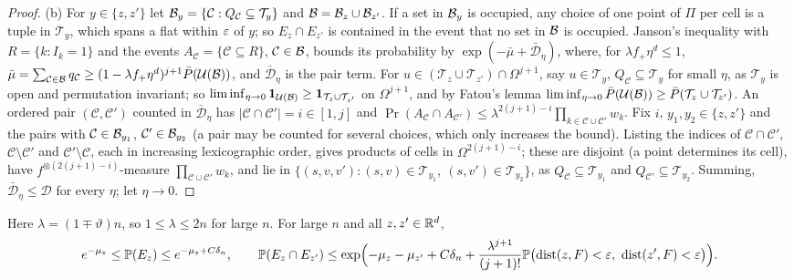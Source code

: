 \documentclass[11pt]{article}
\begin{document}
\begin{proof}
(b) For $y\in\{z,z'\}$ let $\mathcal{B}_y=\{\mathcal C:Q_{\mathcal C}\subseteq\mathcal T_y\}$ and $\mathcal{B}=\mathcal{B}_z\cup\mathcal{B}_{z'}$. If a set in $\mathcal{B}_y$ is occupied, any choice of one
point of $\Pi$ per cell is a tuple in $\mathcal T_y$, which spans a flat within $\varepsilon$ of $y$; so $E_z\cap E_{z'}$ is contained in the event
that no set in $\mathcal{B}$ is occupied. Janson's inequality with $R=\{k:I_k=1\}$ and the events $A_{\mathcal C}=\{\mathcal C\subseteq R\}$, $\mathcal C\in\mathcal{B}$, bounds
its probability by $\exp(-\bar\mu+\bar{\mathcal D}_\eta)$, where, for $\lambda f_+\eta^d\le1$, $\bar\mu=\sum_{\mathcal C\in\mathcal{B}}q_{\mathcal C}\ge(1-\lambda f_+\eta^d)^{j+1}\bar P(\mathcal U(\mathcal{B}))$,
and $\bar{\mathcal D}_\eta$ is the pair term. For $u\in(\mathcal T_z\cup\mathcal T_{z'})\cap\Omega^{j+1}$, say $u\in\mathcal T_y$, $Q_{\mathcal C}\subseteq\mathcal T_y$ for small $\eta$, as $\mathcal T_y$ is
open and permutation invariant; so $\liminf_{\eta\to0}\mathbf{1}_{\mathcal U(\mathcal{B})}\ge\mathbf{1}_{\mathcal T_z\cup\mathcal T_{z'}}$ on $\Omega^{j+1}$, and by Fatou's lemma
$\liminf_{\eta\to0}\bar P(\mathcal U(\mathcal{B}))\ge\bar P(\mathcal T_z\cup\mathcal T_{z'})$. An ordered pair $(\mathcal C,\mathcal C')$ counted in $\bar{\mathcal D}_\eta$ has
$|\mathcal C\cap\mathcal C'|=i\in[1,j]$ and $\Pr(A_{\mathcal C}\cap A_{\mathcal C'})\le\lambda^{2(j+1)-i}\prod_{k\in\mathcal C\cup\mathcal C'}w_k$. Fix $i$, $y_1,y_2\in\{z,z'\}$ and the
pairs with $\mathcal C\in\mathcal{B}_{y_1}$, $\mathcal C'\in\mathcal{B}_{y_2}$ (a pair may be counted for several choices, which only increases the bound). Listing the
indices of $\mathcal C\cap\mathcal C'$, $\mathcal C\setminus\mathcal C'$ and $\mathcal C'\setminus\mathcal C$, each in increasing lexicographic order, gives products of
cells in $\Omega^{2(j+1)-i}$; these are disjoint (a point determines its cell), have $f^{\otimes(2(j+1)-i)}$-measure $\prod_{\mathcal C\cup\mathcal C'}w_k$,
and lie in $\{(s,v,v'):(s,v)\in\mathcal T_{y_1},\ (s,v')\in\mathcal T_{y_2}\}$, as $Q_{\mathcal C}\subseteq\mathcal T_{y_1}$ and $Q_{\mathcal C'}\subseteq\mathcal T_{y_2}$. Summing,
$\bar{\mathcal D}_\eta\le\mathcal D$ for every $\eta$; let $\eta\to0$.
\end{proof}

\begin{lemma}\label{lem:fam}
Here $\lambda=(1\mp\vartheta)n$, so $1\le\lambda\le2n$ for large $n$. For large $n$ and all $z,z'\in\mathbb{R}^d$,
\[
  e^{-\mu_z}\le\Pr(E_z)\le e^{-\mu_z+C\delta_n},\qquad
  \Pr(E_z\cap E_{z'})\le\exp\Bigl(-\mu_z-\mu_{z'}+C\delta_n+\frac{\lambda^{j+1}}{(j+1)!}\Pr\bigl(\dist(z,F)<\eps,\ \dist(z',F)<\eps\bigr)\Bigr).
\]
\end{lemma}
\end{document}
